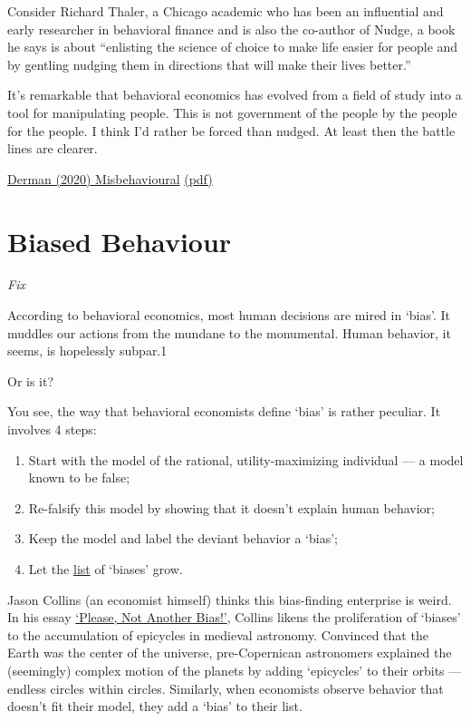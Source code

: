 \documentclass[
]{book}
\providecommand{\tightlist}{%
  \setlength{\itemsep}{0pt}\setlength{\parskip}{0pt}}
\begin{document}
Consider Richard Thaler, a Chicago academic who has been an influential and
early researcher in behavioral finance and is also the co-author of Nudge, a book he says is about
``enlisting the science of choice to make life easier for people and by gentling nudging them in
directions that will make their lives better.''

It's remarkable that behavioral economics has evolved from a field of study into a tool for
manipulating people.
This is not government of the people by the people for the people. I think I'd rather be forced than
nudged. At least then the battle lines are clearer.

\href{http://emanuelderman.com/misbehavioral-psychology/}{Derman (2020) Misbehavioural}
\href{pdf/Derman_2020_Misbehvioural_FAZ.pdf}{(pdf)}

\hypertarget{biased-behaviour}{%
\section{Biased Behaviour}\label{biased-behaviour}}

\emph{Fix}

According to behavioral economics, most human decisions are mired in `bias'. It muddles our actions from the mundane to the monumental. Human behavior, it seems, is hopelessly subpar.1

Or is it?

You see, the way that behavioral economists define `bias' is rather peculiar. It involves 4 steps:

\begin{enumerate}
\def\labelenumi{\arabic{enumi}.}
\tightlist
\item
  Start with the model of the rational, utility-maximizing individual --- a model known to be false;
\item
  Re-falsify this model by showing that it doesn't explain human behavior;
\item
  Keep the model and label the deviant behavior a `bias';
\item
  Let the \href{https://en.wikipedia.org/wiki/List_of_cognitive_biases}{list} of `biases' grow.
\end{enumerate}

Jason Collins (an economist himself) thinks this bias-finding enterprise is weird.
In his essay \href{https://evonomics.com/please-not-another-bias-the-problem-with-behavioral-economics/}{`Please, Not Another Bias!'}, Collins likens the proliferation of `biases' to the accumulation of epicycles in medieval astronomy. Convinced that the Earth was the center of the universe, pre-Copernican astronomers explained the (seemingly) complex motion of the planets by adding `epicycles' to their orbits --- endless circles within circles. Similarly, when economists observe behavior that doesn't fit their model, they add a `bias' to their list.
\end{document}
